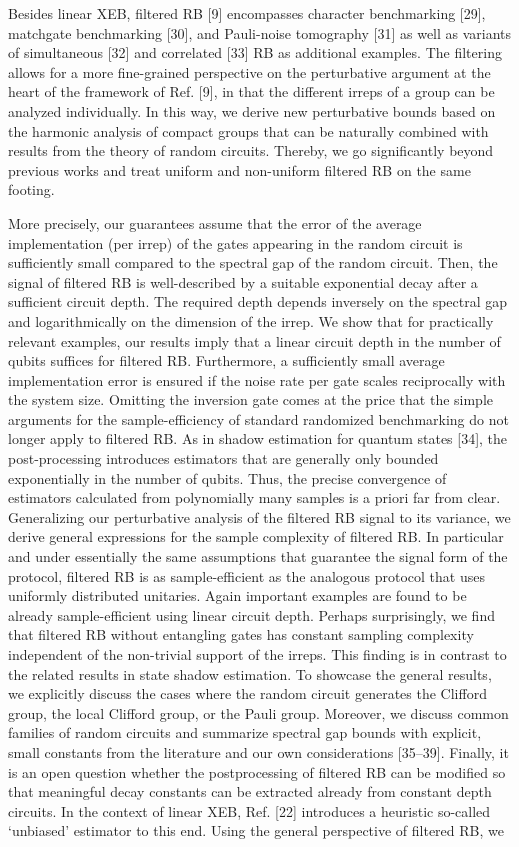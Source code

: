 Besides linear XEB, filtered RB [9] encompasses character benchmarking [29], matchgate benchmarking [30], and Pauli-noise tomography [31] as well as variants of simultaneous [32] and correlated [33] RB as additional examples. The filtering allows for a more fine-grained perspective on the perturbative argument at the heart of the framework of Ref. [9], in that the different irreps of a group can be analyzed individually. In this way, we derive new perturbative bounds based on the harmonic analysis of compact groups that can be naturally combined with results from the theory of random circuits. Thereby, we go significantly beyond previous works and treat uniform and non-uniform filtered RB on the same footing.

More precisely, our guarantees assume that the error of the average implementation (per irrep) of the gates appearing in the random circuit is sufficiently small compared to the spectral gap of the random circuit. Then, the signal of filtered RB is well-described by a suitable exponential decay after a sufficient circuit depth. The required depth depends inversely on the spectral gap and logarithmically on the dimension of the irrep. We show that for practically relevant examples, our results imply that a linear circuit depth in the number of qubits suffices for filtered RB. Furthermore, a sufficiently small average implementation error is ensured if the noise rate per gate scales reciprocally with the system size. Omitting the inversion gate comes at the price that the simple arguments for the sample-efficiency of standard randomized benchmarking do not longer apply to filtered RB. As in shadow estimation for quantum states [34], the post-processing introduces estimators that are generally only bounded exponentially in the number of qubits. Thus, the precise convergence of estimators calculated from polynomially many samples is a priori far from clear. Generalizing our perturbative analysis of the filtered RB signal to its variance, we derive general expressions for the sample complexity of filtered RB. In particular and under essentially the same assumptions that guarantee the signal form of the protocol, filtered RB is as sample-efficient as the analogous protocol that uses uniformly distributed unitaries. Again important examples are found to be already sample-efficient using linear circuit depth. Perhaps surprisingly, we find that filtered RB without entangling gates has constant sampling complexity independent of the non-trivial support of the irreps. This finding is in contrast to the related results in state shadow estimation. To showcase the general results, we explicitly discuss the cases where the random circuit generates the Clifford group, the local Clifford group, or the Pauli group. Moreover, we discuss common families of random circuits and summarize spectral gap bounds with explicit, small constants from the literature and our own considerations [35–39]. Finally, it is an open question whether the postprocessing of filtered RB can be modified so that meaningful decay constants can be extracted already from constant depth circuits. In the context of linear XEB, Ref. [22] introduces a heuristic so-called ‘unbiased’ estimator to this end. Using the general perspective of filtered RB, we 